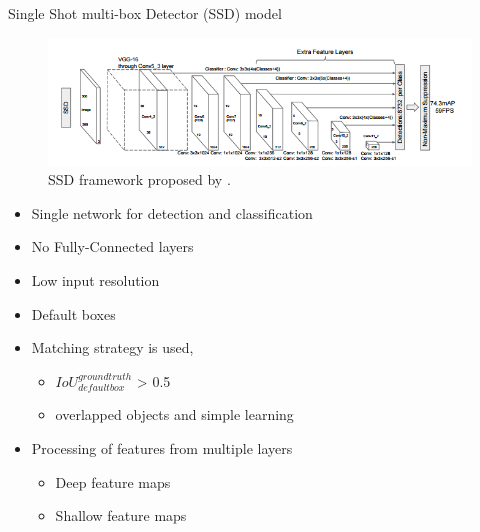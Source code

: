 \documentclass[10pt, aspectratio=169]{beamer}
\begin{document}
\begin{frame}[allowframebreaks]{Single Shot multi-box Detector (SSD) model}
    \begin{figure}[!ht]
        \centering
        \includegraphics[scale=0.45]{images/SSD.png}
        \caption[SSD framework]{SSD framework proposed by \citet[p. 24]{Liu2016SSDSS}.}
        \label{fig:Fr-RCNN}
    \end{figure}
    \smallskip
    \begin{multicols}{2}
        \begin{itemize}
            \item Single network for detection and classification
            \item No Fully-Connected layers
            \item Low input resolution
        \end{itemize}
    \end{multicols}

    \begin{multicols}{2} %
        \begin{itemize}
            \item Default boxes
            \item Matching strategy is used,
                \begin{itemize}
                    \item $ IoU_{default box}^{ground truth}$ > 0.5
                    \item overlapped objects and simple learning 
                \end{itemize}
                
            \item Processing of features from multiple layers
                \begin{itemize}
                    \item Deep feature maps
                    \item Shallow feature maps
                \end{itemize}
        \end{itemize}


\end{multicols}
\end{frame}
\end{document}
